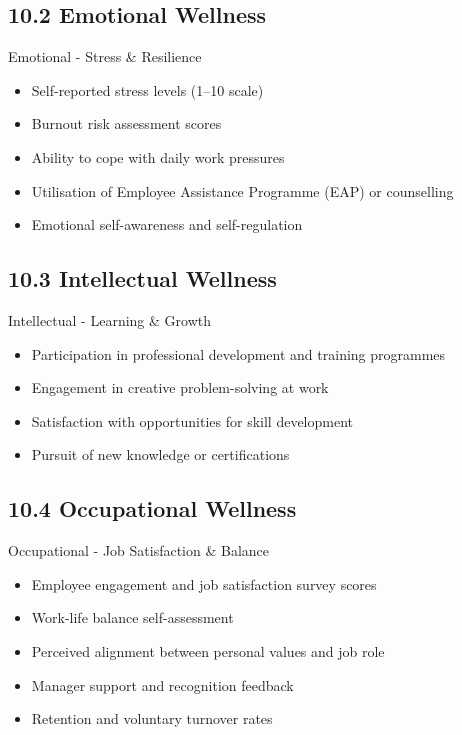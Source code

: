\documentclass[11pt,a4paper]{article}
\begin{document}
\subsection{10.2 Emotional Wellness}
\begin{defbox}{Emotional - Stress \& Resilience}
\begin{itemize}
  \item Self-reported stress levels (1–10 scale)
  \item Burnout risk assessment scores
  \item Ability to cope with daily work pressures
  \item Utilisation of Employee Assistance Programme (EAP) or counselling
  \item Emotional self-awareness and self-regulation
\end{itemize}
\end{defbox}

\subsection{10.3 Intellectual Wellness}
\begin{defbox}{Intellectual - Learning \& Growth}
\begin{itemize}
  \item Participation in professional development and training programmes
  \item Engagement in creative problem-solving at work
  \item Satisfaction with opportunities for skill development
  \item Pursuit of new knowledge or certifications
\end{itemize}
\end{defbox}

\subsection{10.4 Occupational Wellness}
\begin{defbox}{Occupational - Job Satisfaction \& Balance}
\begin{itemize}
  \item Employee engagement and job satisfaction survey scores
  \item Work-life balance self-assessment
  \item Perceived alignment between personal values and job role
  \item Manager support and recognition feedback
  \item Retention and voluntary turnover rates
\end{itemize}
\end{defbox}
\end{document}
